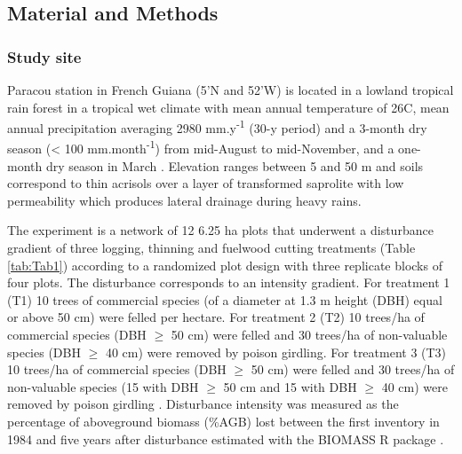 \documentclass[
  11pt,
  french,
  A4paper,
  extrafontsizes,onecolumn,openright
  ]{memoir}
\begin{document}
\subsection{Material and Methods}\label{material-and-methods}

\subsubsection{Study site}\label{study-site}

Paracou station in French Guiana (5'N and
52'W) is located in a lowland tropical rain forest in a
tropical wet climate with mean annual temperature of 26\textdegree C,
mean annual precipitation averaging 2980 mm.y\textsuperscript{-1} (30-y
period) and a 3-month dry season (\textless{} 100
mm.month\textsuperscript{-1}) from mid-August to mid-November, and a
one-month dry season in March \autocite{Wagner2011}. Elevation ranges
between 5 and 50 m and soils correspond to thin acrisols over a layer of
transformed saprolite with low permeability which produces lateral
drainage during heavy rains.

The experiment is a network of 12 6.25 ha plots that underwent a
disturbance gradient of three logging, thinning and fuelwood cutting
treatments (Table \ref{tab:Tab1}) according to a randomized plot design
with three replicate blocks of four plots. The disturbance corresponds
to an intensity gradient. For treatment 1 (T1) 10 trees of commercial
species (of a diameter at 1.3 m height (DBH) equal or above 50 cm) were
felled per hectare. For treatment 2 (T2) 10 trees/ha of commercial
species (DBH \(\geq\) 50 cm) were felled and 30 trees/ha of non-valuable
species (DBH \(\geq\) 40 cm) were removed by poison girdling. For
treatment 3 (T3) 10 trees/ha of commercial species (DBH \(\geq\) 50 cm)
were felled and 30 trees/ha of non-valuable species (15 with DBH
\(\geq\) 50 cm and 15 with DBH \(\geq\) 40 cm) were removed by poison
girdling \autocite{Schmitt1990}. Disturbance intensity was measured as
the percentage of aboveground biomass (\%AGB) lost between the first
inventory in 1984 and five years after disturbance
\autocite{Piponiot2016} estimated with the BIOMASS R package
\autocite{Biomass2018}.

\begingroup\fontsize{7}{9}\selectfont
\end{document}
